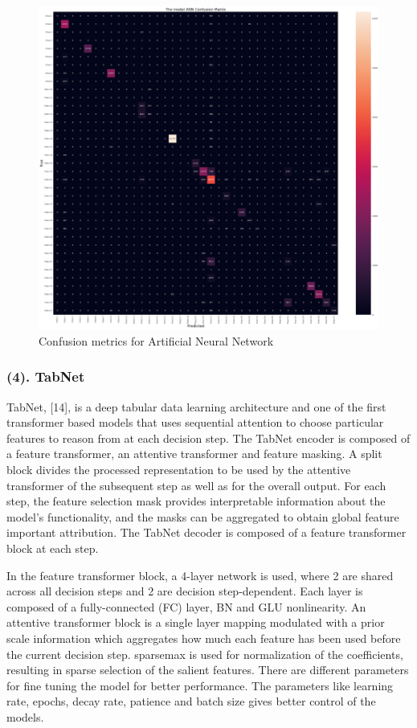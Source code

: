 \documentclass[10 pt,conference,final,]{IEEEtran}
\begin{document}
\begin{figure}

{\centering \includegraphics[width=0.9\linewidth]{img/ANN} 

}

\caption{Confusion metrics for Artificial Neural Network}\label{fig:unnamed-chunk-14}
\end{figure}

\subsubsection{(4). TabNet}\label{tabnet}

TabNet, {[}14{]}, is a deep tabular data learning architecture and one
of the first transformer based models that uses sequential attention to
choose particular features to reason from at each decision step. The
TabNet encoder is composed of a feature transformer, an attentive
transformer and feature masking. A split block divides the processed
representation to be used by the attentive transformer of the subsequent
step as well as for the overall output. For each step, the feature
selection mask provides interpretable information about the model's
functionality, and the masks can be aggregated to obtain global feature
important attribution. The TabNet decoder is composed of a feature
transformer block at each step.

In the feature transformer block, a 4-layer network is used, where 2 are
shared across all decision steps and 2 are decision step-dependent. Each
layer is composed of a fully-connected (FC) layer, BN and GLU
nonlinearity. An attentive transformer block is a single layer mapping
modulated with a prior scale information which aggregates how much each
feature has been used before the current decision step. sparsemax is
used for normalization of the coefficients, resulting in sparse
selection of the salient features. There are different parameters for
fine tuning the model for better performance. The parameters like
learning rate, epochs, decay rate, patience and batch size gives better
control of the models.
\end{document}
